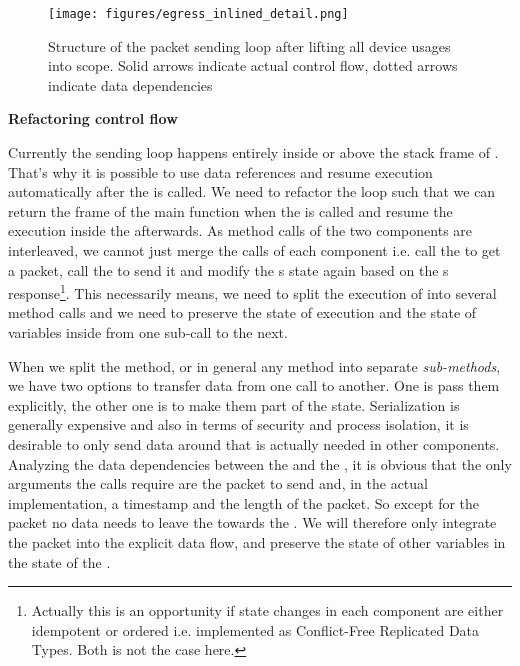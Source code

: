 \begin{figure}[H]
    \centering
    \texttt{[image: figures/egress\_inlined\_detail.png]}
    \caption{Structure of the packet sending loop after lifting all device usages into scope. 
    Solid arrows indicate actual control flow, dotted arrows indicate data dependencies}
    \label{fig:egressInlinedFlow}
\end{figure}

\textbf{Refactoring control flow}

Currently the sending loop happens entirely inside or above the stack frame of . That's why it is possible to use data references and resume execution automatically after the \dev{} is called. We need to refactor the loop such that we can return the frame of the main function when the \dev{} is called and resume the execution inside the \stack{} afterwards. As method calls of the two components are interleaved, we cannot just merge the calls of each component i.e. call the \stack{} to get a packet, call the \dev{} to send it and modify the \stack{}s state again based on the \dev{}s response\footnote{Actually this is an opportunity if state changes in each component are either idempotent or ordered i.e. implemented as Conflict-Free Replicated Data Types. Both is not the case here.}. This necessarily means, we need to split the execution of  into several method calls and we need to preserve the state of execution and the state of variables inside  from one sub-call to the next. 

When we split the  method, or in general any method into separate \emph{sub-methods}, we have two options to transfer data from one call to another. One is pass them explicitly, the other one is to make them part of the state. Serialization is generally expensive and also in terms of security and process isolation, it is desirable to only send data around that is actually needed in other components. Analyzing the data dependencies between the \stack{} and the \dev{}, it is obvious that the only arguments the \dev{} calls require are the packet to send and, in the actual implementation, a timestamp and the length of the packet. So except for the packet no data needs to leave the \stack{} towards the \dev{}. We will therefore only integrate the packet into the explicit data flow, and preserve the state of other variables in the state of the \stack{}.\\

